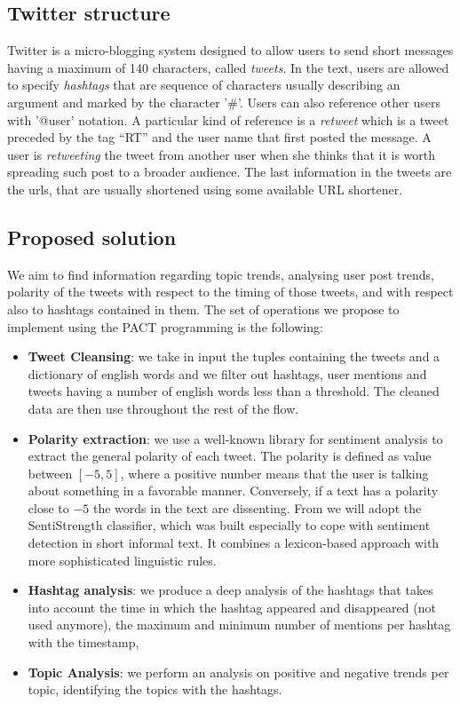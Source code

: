 \subsection{Twitter structure}
Twitter is a micro-blogging system designed to allow users to send short messages having a maximum of 140 characters, called \textit{tweets}. 
In the text, users are allowed to specify \textit{hashtags} that are sequence of characters usually describing an argument and marked by the character '\#'. 
Users can also reference other users with '@user' notation. 
A particular kind of reference is a \textit{retweet} which is a tweet preceded by the tag ``RT'' and the user name that first posted the message. 
A user is \emph{retweeting} the tweet from another user when she thinks that it is worth spreading such post to a broader audience.
The last information in the tweets are the urls, that are usually shortened using some available URL shortener. 

\subsection{Proposed solution}
We aim to find information regarding topic trends, analysing user post trends, polarity of the tweets with respect to the timing of those tweets, and with respect also to hashtags contained in them. 
The set of operations we propose to implement using the PACT programming is the following:  
\begin{itemize}
\item \textbf{Tweet Cleansing}: we take in input the tuples containing the tweets and a dictionary of english words and we filter out hashtags, user mentions and tweets having a number of english words less than a threshold. The cleaned data are then use throughout the rest of the flow. 
\item \textbf{Polarity extraction}: we use a well-known library for sentiment analysis to extract the general polarity of each tweet. The polarity is defined as value between $[-5,5]$, where a positive number means that the user is talking about something in a favorable manner. Conversely, if a text has a polarity close to $-5$ the words in the text are dissenting. 
From \cite{Thelwall:2010:SSS:1890706.1890713}  we will adopt the SentiStrength  classifier, which was built especially to cope with sentiment detection in short informal text.
It combines a lexicon-based approach with more sophisticated linguistic rules.

\item \textbf{Hashtag analysis}: we produce a deep analysis of the hashtags that takes into account the time in which the hashtag appeared and disappeared (not used anymore), the maximum and minimum number of mentions per hashtag with the timestamp,  
\item \textbf{Topic Analysis}:  we perform an analysis on positive and negative trends per topic, identifying the topics with the hashtags. 
\end{itemize}

